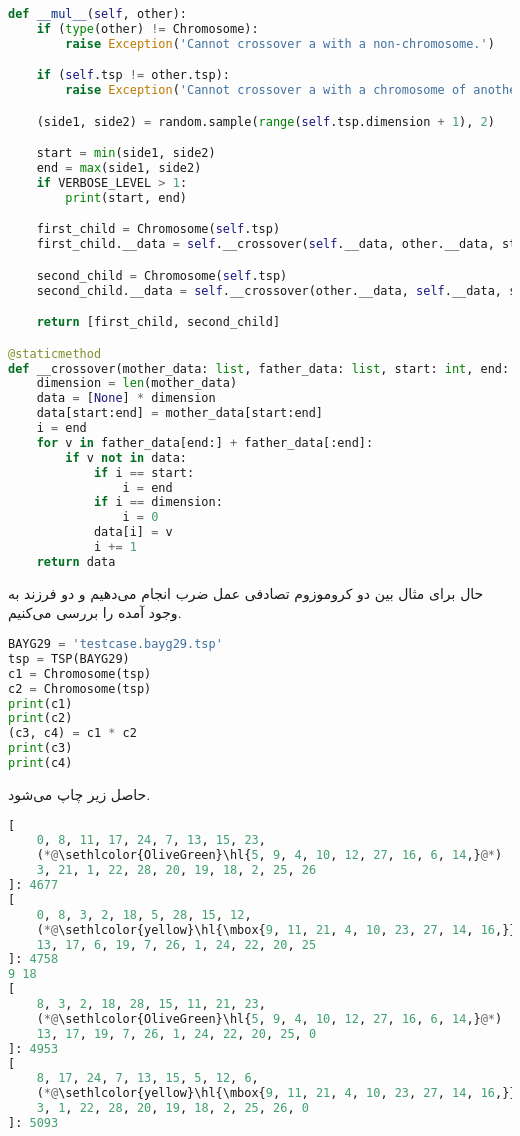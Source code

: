 \documentclass[a4paper, 12pt]{article}
\theoremstyle{definition}
\begin{document}
\LTR
\begin{lstlisting}[language=Python]
def __mul__(self, other):
    if (type(other) != Chromosome):
        raise Exception('Cannot crossover a with a non-chromosome.')

    if (self.tsp != other.tsp):
        raise Exception('Cannot crossover a with a chromosome of another tsp.')

    (side1, side2) = random.sample(range(self.tsp.dimension + 1), 2)

    start = min(side1, side2)
    end = max(side1, side2)
    if VERBOSE_LEVEL > 1:
        print(start, end)

    first_child = Chromosome(self.tsp)
    first_child.__data = self.__crossover(self.__data, other.__data, start, end)

    second_child = Chromosome(self.tsp)
    second_child.__data = self.__crossover(other.__data, self.__data, start, end)

    return [first_child, second_child]

@staticmethod
def __crossover(mother_data: list, father_data: list, start: int, end: int):
    dimension = len(mother_data)
    data = [None] * dimension
    data[start:end] = mother_data[start:end]
    i = end
    for v in father_data[end:] + father_data[:end]:
        if v not in data:
            if i == start:
                i = end
            if i == dimension:
                i = 0
            data[i] = v
            i += 1
    return data
\end{lstlisting}
\RTL

حال برای مثال بین دو کروموزوم تصادفی عمل ضرب انجام می‌دهیم و دو فرزند به وجود آمده را بررسی می‌کنیم.

\LTR
\begin{lstlisting}[language=Python]
BAYG29 = 'testcase.bayg29.tsp'
tsp = TSP(BAYG29)
c1 = Chromosome(tsp)
c2 = Chromosome(tsp)
print(c1)
print(c2)
(c3, c4) = c1 * c2
print(c3)
print(c4)
\end{lstlisting}
\RTL

حاصل زیر چاپ می‌شود.

\LTR
\begin{lstlisting}[language=Python]
[
    0, 8, 11, 17, 24, 7, 13, 15, 23,
    (*@\sethlcolor{OliveGreen}\hl{5, 9, 4, 10, 12, 27, 16, 6, 14,}@*)
    3, 21, 1, 22, 28, 20, 19, 18, 2, 25, 26
]: 4677
[
    0, 8, 3, 2, 18, 5, 28, 15, 12,
    (*@\sethlcolor{yellow}\hl{\mbox{9, 11, 21, 4, 10, 23, 27, 14, 16,}}@*)
    13, 17, 6, 19, 7, 26, 1, 24, 22, 20, 25
]: 4758
9 18
[
    8, 3, 2, 18, 28, 15, 11, 21, 23,
    (*@\sethlcolor{OliveGreen}\hl{5, 9, 4, 10, 12, 27, 16, 6, 14,}@*)
    13, 17, 19, 7, 26, 1, 24, 22, 20, 25, 0
]: 4953
[
    8, 17, 24, 7, 13, 15, 5, 12, 6,
    (*@\sethlcolor{yellow}\hl{\mbox{9, 11, 21, 4, 10, 23, 27, 14, 16,}}@*)
    3, 1, 22, 28, 20, 19, 18, 2, 25, 26, 0
]: 5093    
\end{lstlisting}
\RTL
\end{document}
